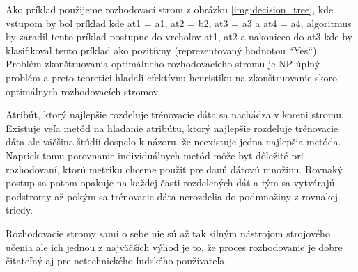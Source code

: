 Ako príklad použijeme rozhodovací strom z obrázku \ref{img:decision_tree}, kde vstupom by bol príklad kde at1 = a1, at2 = b2, at3 = a3 a at4 = a4, algoritmus by zaradil tento príklad postupne do vrcholov at1, at2 a nakonieco do at3 kde by klasifikoval tento príklad ako pozitívny (reprezentovaný hodnotou ``Yes``). Problém zkonštruovania optimálneho rozhodovacieho stromu je NP-úplný problém a preto teoretici hľadali efektívnu heuristiku na zkonštruovanie skoro optimálnych rozhodovacích stromov.\par
Atribút, ktorý najlepšie rozdeluje trénovacie dáta sa nachádza v koreni stromu. Existuje veľa metód na hladanie atribútu, ktorý najlepšie rozdeľuje trénovacie dáta ale väčšina štúdií dospelo k názoru, že neexistuje jedna najlepšia metóda\cite{decision_trees}. Napriek tomu porovnanie individuálnych metód môže byť dôležité pri rozhodovaní, ktorú metriku chceme použiť pre danú dátovú množinu. Rovnaký postup sa potom opakuje na každej časti rozdelených dát a tým sa vytvárajú podstromy až pokým sa trénovacie dáta nerozdelia do podmnožiny z rovnakej triedy.\par
Rozhodovacie stromy sami o sebe nie sú až tak silným nástrojom strojového učenia ale ich jednou z najväčších výhod je to, že proces rozhodovanie je dobre čitateľný aj pre netechnického ľudského používateľa.
